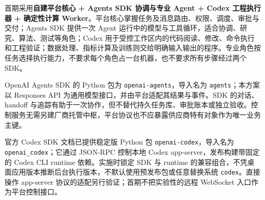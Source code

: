 \documentclass[11pt,a4paper]{article}
\begin{document}
首期采用\textbf{自建平台核心 + Agents SDK 协调与专业 Agent + Codex 工程执行器 + 确定性计算 Worker}。平台核心掌握任务及消息路由、权限、调度、审批与交付；Agents SDK 提供一次 Agent 运行中的模型与工具循环，适合协调、研究、算法、测试等角色；Codex 用于受控工作区内的代码阅读、修改、命令执行和工程验证；数据处理、指标计算及训练则交给明确输入输出的程序。专业角色按任务选择执行能力，不要求每个角色占一台机器，也不要求所有步骤经过两个 SDK。

OpenAI Agents SDK 的 Python 包为 \texttt{openai-agents}，导入名为 \texttt{agents}；本方案以 Responses API 为通用模型接口，并由平台适配其结果与事件。SDK 的对话、handoff 与追踪有助于一次协作，但不替代持久任务库、审批账本或独立验收。控制服务无需另建厂商托管中枢，平台协议也不应暴露供应商特有对象作为唯一业务主键。\cite{rdRuntimeSdk}

官方 Codex SDK 文档已提供稳定版 Python 包 \texttt{openai-codex}，导入名为 \texttt{openai\_codex}；它通过 JSON-RPC 控制本地 Codex app-server，发布构建带固定的 Codex CLI runtime 依赖。实施时锁定 SDK 与 runtime 的兼容组合，不凭桌面应用版本推断后台执行版本，不默认使用预发布包或任意替换系统 \texttt{codex}。直接操作 app-server 协议的适配另行验证；首期不把实验性的远程 WebSocket 入口作为平台控制接口。\cite{codex-sdk,codex-app}
\end{document}
